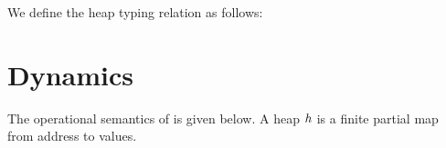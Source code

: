 \documentclass[10pt]{scrartcl}
\begin{document}
We define the heap typing relation as follows:
\
\begin{mathparpagebreakable}
\end{mathparpagebreakable}

\section{Dynamics}
\label{sec:dynamics}
The operational semantics of \TheLang{} is given below. A heap $\heap$ is a finite partial map from address to values.

\newsavebox{\lecondition}
\newsavebox{\ltcondition}
\newsavebox{\eqcondition}
\end{document}
